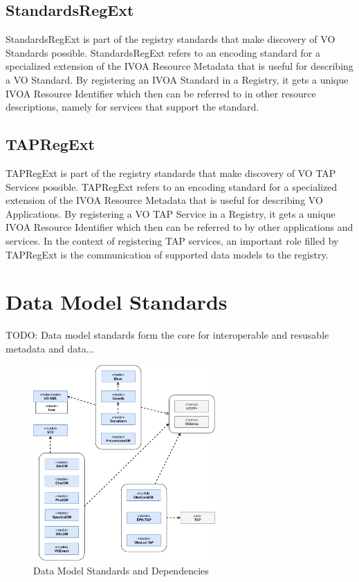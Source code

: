 \documentclass[11pt,a4paper]{ivoa}
\begin{document}
\subsection{StandardsRegExt}

StandardsRegExt is part of the registry standards that make discovery of VO Standards possible.  
StandardsRegExt refers to an encoding standard for a specialized extension of the IVOA Resource 
Metadata that is useful for describing a VO Standard.  By registering an IVOA Standard in a 
Registry, it gets a unique IVOA Resource Identifier which then can be referred to in other 
resource descriptions, namely for services that support the standard.

\subsection{TAPRegExt}

TAPRegExt is part of the registry standards that make discovery of VO TAP Services possible.  
TAPRegExt refers to an encoding standard for a specialized extension of the IVOA Resource Metadata 
that is useful for describing VO Applications.  By registering a VO TAP Service in a Registry, it 
gets a unique IVOA Resource Identifier which then can be referred to by other applications and 
services.  In the context of registering TAP services, an important role filled by TAPRegExt is 
the communication of supported data models to the registry.

\section{Data Model Standards}

TODO: Data model standards form the core for interoperable and resusable metadata and data...

\begin{figure}
\centering
\includegraphics[width=0.62\textwidth]{ivoa-arch-dm.pdf}
\caption{Data Model Standards and Dependencies}
\label{fig:dmdeps}
\end{figure}
\end{document}
